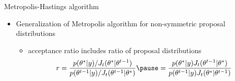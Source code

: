 \documentclass[finnish,english,t]{beamer}
\begin{document}
\begin{frame}{Metropolis-Hastings algorithm}

  \begin{itemize}
  \item Generalization of Metropolis algorithm for non-symmetric proposal distributions
    \begin{itemize}
    \item acceptance ratio includes ratio of proposal distributions
      \begin{equation*}
        r =
        \frac{p(\theta^{*}|y)/J_t(\theta^{*}|\theta^{t-1})}{p(\theta^{t-1}|y)/J_t(\theta^{t-1}|\theta^{*})} \pause =
        \frac{p(\theta^{*}|y)J_t(\theta^{t-1}|\theta^{*})}{p(\theta^{t-1}|y)J_t(\theta^{*}|\theta^{t-1})}
      \end{equation*}
    \end{itemize}
  \end{itemize}

\end{frame}




\end{document}
